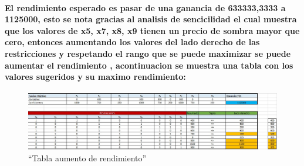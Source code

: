 \documentclass[
]{article}
\begin{document}
\hypertarget{el-rendimiento-esperado-es-pasar-de-una-ganancia-de-6333333333-a-1125000-esto-se-nota-gracias-al-analisis-de-sencicilidad-el-cual-muestra-que-los-valores-de-x5-x7-x8-x9-tienen-un-precio-de-sombra-mayor-que-cero-entonces-aumentando-los-valores-del-lado-derecho-de-las-restricciones-y-respetando-el-rango-que-se-puede-maximizar-se-puede-aumentar-el-rendimiento-acontinuacion-se-muestra-una-tabla-con-los-valores-sugeridos-y-su-maximo-rendimiento}{%
\paragraph{\texorpdfstring{El rendimiento esperado es pasar de una
ganancia de \textbf{633333,3333} a \textbf{1125000}, esto se nota
gracias al analisis de sencicilidad el cual muestra que los valores de
x5, x7, x8, x9 tienen un precio de sombra mayor que cero, entonces
aumentando los valores del lado derecho de las restricciones y
respetando el rango que se puede maximizar se puede aumentar el
rendimiento , acontinuacion se muestra una tabla con los valores
sugeridos y su maximo
rendimiento:}{El rendimiento esperado es pasar de una ganancia de 633333,3333 a 1125000, esto se nota gracias al analisis de sencicilidad el cual muestra que los valores de x5, x7, x8, x9 tienen un precio de sombra mayor que cero, entonces aumentando los valores del lado derecho de las restricciones y respetando el rango que se puede maximizar se puede aumentar el rendimiento , acontinuacion se muestra una tabla con los valores sugeridos y su maximo rendimiento:}}\label{el-rendimiento-esperado-es-pasar-de-una-ganancia-de-6333333333-a-1125000-esto-se-nota-gracias-al-analisis-de-sencicilidad-el-cual-muestra-que-los-valores-de-x5-x7-x8-x9-tienen-un-precio-de-sombra-mayor-que-cero-entonces-aumentando-los-valores-del-lado-derecho-de-las-restricciones-y-respetando-el-rango-que-se-puede-maximizar-se-puede-aumentar-el-rendimiento-acontinuacion-se-muestra-una-tabla-con-los-valores-sugeridos-y-su-maximo-rendimiento}}

\begin{figure}
\centering
\includegraphics{max.jpeg}
\caption{``Tabla aumento de rendimiento''}
\end{figure}
\end{document}
